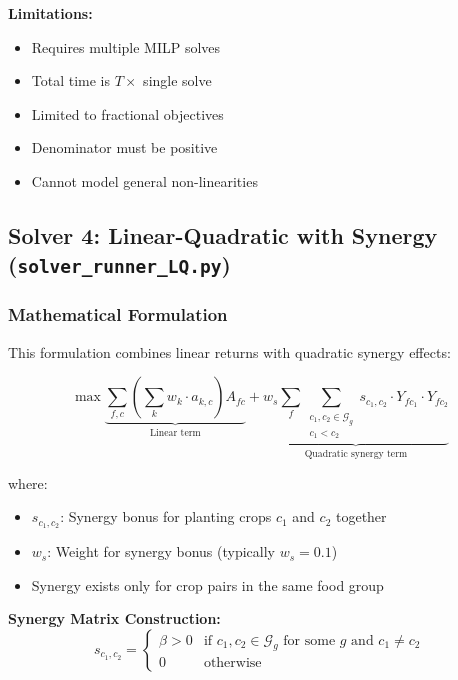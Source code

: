 \documentclass[11pt,a4paper]{article}
\begin{document}
\textbf{Limitations:}
\begin{itemize}
    \item Requires multiple MILP solves
    \item Total time is $T \times$ single solve
    \item Limited to fractional objectives
    \item Denominator must be positive
    \item Cannot model general non-linearities
\end{itemize}

\subsection{Solver 4: Linear-Quadratic with Synergy (\texttt{solver\_runner\_LQ.py})}

\subsubsection{Mathematical Formulation}

This formulation combines linear returns with quadratic synergy effects:

\begin{equation}
\max \underbrace{\sum_{f,c} \left(\sum_k w_k \cdot a_{k,c}\right) A_{fc}}_{\text{Linear term}} + \underbrace{w_s \sum_f \sum_{\substack{c_1,c_2 \in \mathcal{G}_g\\ c_1 < c_2}} s_{c_1,c_2} \cdot Y_{fc_1} \cdot Y_{fc_2}}_{\text{Quadratic synergy term}}
\label{eq:lq_obj}
\end{equation}

where:
\begin{itemize}
    \item $s_{c_1,c_2}$: Synergy bonus for planting crops $c_1$ and $c_2$ together
    \item $w_s$: Weight for synergy bonus (typically $w_s = 0.1$)
    \item Synergy exists only for crop pairs in the same food group
\end{itemize}

\textbf{Synergy Matrix Construction:}
\begin{equation}
s_{c_1,c_2} = \begin{cases}
\beta > 0 & \text{if } c_1, c_2 \in \mathcal{G}_g \text{ for some } g \text{ and } c_1 \neq c_2\\
0 & \text{otherwise}
\end{cases}
\end{equation}
\end{document}
